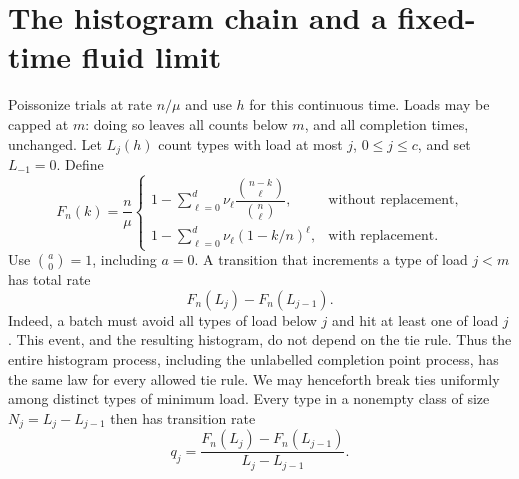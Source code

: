 \documentclass[11pt]{article}
\theoremstyle{remark}\newtheorem{remark}[theorem]{Remark}
\begin{document}
\section{The histogram chain and a fixed-time fluid limit}
Poissonize trials at rate $n/\mu$ and use $h$ for this continuous time.
Loads may be capped at $m$: doing so leaves all counts below $m$, and all
completion times, unchanged. Let $L_j(h)$ count types with load at most $j$,
$0\le j\le c$, and set $L_{-1}=0$.
Define
\begin{equation}\label{eq:Fn}
 F_n(k)=\frac n\mu\begin{cases}
  1-\displaystyle\sum_{\ell=0}^d\nu_\ell
       \dfrac{\binom{n-k}{\ell}}{\binom n\ell},&\text{without replacement},\\[6pt]
  1-\displaystyle\sum_{\ell=0}^d\nu_\ell(1-k/n)^\ell,&\text{with replacement}.
 \end{cases}
\end{equation}
Use $\binom a0=1$, including $a=0$.
A transition that increments a type of load $j<m$ has total rate
\begin{equation}\label{eq:classrate}
 F_n(L_j)-F_n(L_{j-1}).
\end{equation}
Indeed, a batch must avoid all types of load below $j$ and hit at least one
of load $j$. This event, and the resulting histogram, do not depend on the
tie rule. Thus the entire histogram process, including the unlabelled
completion point process, has the same law for every allowed tie rule.
We may henceforth break ties uniformly among distinct types of minimum load.
Every type in a nonempty class of size $N_j=L_j-L_{j-1}$ then has transition rate
\begin{equation}\label{eq:q}
 q_j=\frac{F_n(L_j)-F_n(L_{j-1})}{L_j-L_{j-1}}.
\end{equation}
\end{document}
